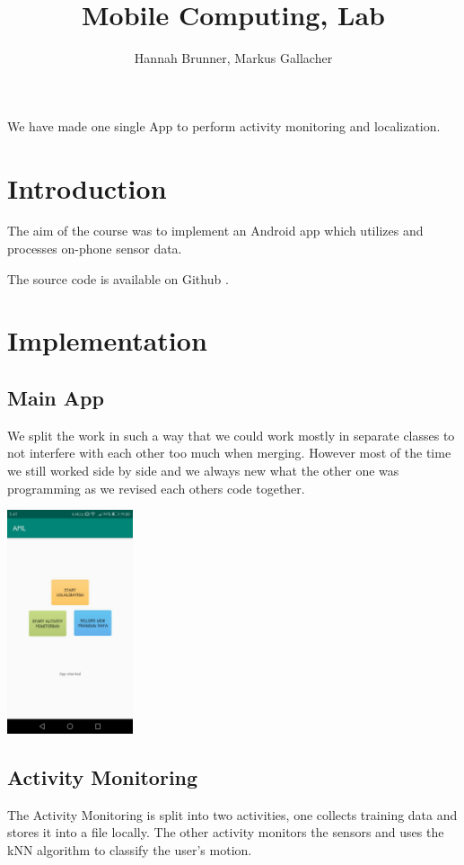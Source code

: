 \documentclass[12pt]{article}
\begin{document}
 
\title{Mobile Computing, Lab}
\author{Hannah Brunner, Markus Gallacher}

\maketitle


We have made one single App to perform activity monitoring and localization. 

\section{Introduction}

The aim of the course was to implement an Android app which utilizes and processes on-phone sensor data. 

The source code is available on Github \cite{repo}.

\section{Implementation}
\subsection{Main App}
We split the work in such a way that we could work mostly in separate classes to not interfere with each other too much when merging. However most of the time we still worked side by side and we always new what the other one was programming as we revised each others code together.

\begin{center}
  \includegraphics[width=140px]{images/main.jpeg}
\end{center}

\pagebreak

\subsection{Activity Monitoring}
The Activity Monitoring is split into two activities, one collects training data and stores it into a file locally. The other activity monitors the sensors and uses the kNN algorithm to classify the user's motion.
\end{document}
